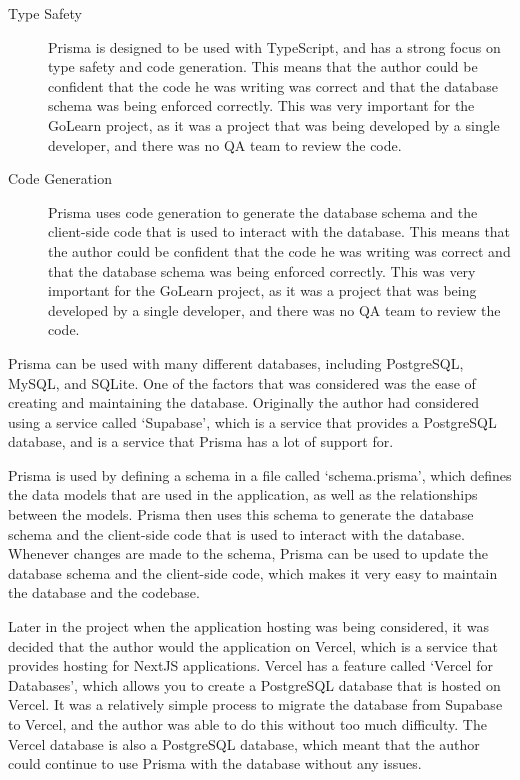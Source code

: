 \documentclass[11pt, a4paper,twoside]{report}
\theoremstyle{plain} %
\theoremstyle{definition} %
\numberwithin{equation}{chapter}
\begin{document}
\begin{description}
    \item[Type Safety\cite{prisma-type-safety}] {
        Prisma is designed to be used with TypeScript, and has a strong focus
        on type safety and code generation. This means that the author could
        be confident that the code he was writing was correct and that the
        database schema was being enforced correctly. This was very important
        for the GoLearn project, as it was a project that was being developed
        by a single developer, and there was no QA team to review the code.
        }
    \item[Code Generation\cite{prisma-code-generation}] {
        Prisma uses code generation to generate the database schema and the
        client-side code that is used to interact with the database. This
        means that the author could be confident that the code he was writing
        was correct and that the database schema was being enforced correctly.
        This was very important for the GoLearn project, as it was a project
        that was being developed by a single developer, and there was no QA
        team to review the code.
        }
\end{description}

Prisma can be used with many different databases, including PostgreSQL, MySQL,
and SQLite. One of the factors that was considered was the ease of creating and
maintaining the database. Originally the author had considered using a service
called `Supabase', which is a service that provides a PostgreSQL database, and
is a service that Prisma has a lot of support for.

Prisma is used by defining a schema in a file called `schema.prisma', which
defines the data models that are used in the application, as well as the
relationships between the models. Prisma then uses this schema to generate the
database schema and the client-side code that is used to interact with the
database. Whenever changes are made to the schema, Prisma can be used to update
the database schema and the client-side code, which makes it very easy to
maintain the database and the codebase.

Later in the project when the application hosting was being considered, it was
decided that the author would the application on Vercel, which is a service
that provides hosting for NextJS applications. Vercel has a feature called
`Vercel for Databases', which allows you to create a PostgreSQL database that
is hosted on Vercel. It was a relatively simple process to migrate the database
from Supabase to Vercel, and the author was able to do this without too much
difficulty. The Vercel database is also a PostgreSQL database, which meant that
the author could continue to use Prisma with the database without any issues.
\end{document}
